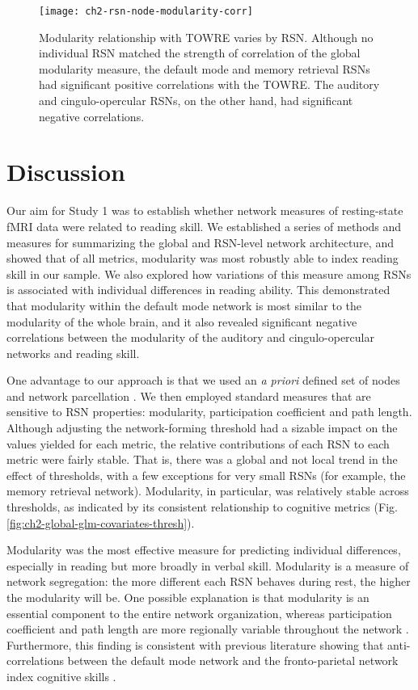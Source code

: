 \begin{figure}[t]
    \centering
    \texttt{[image: ch2-rsn-node-modularity-corr]}
    \caption[Modularity relationship with TOWRE varies by RSN.] {Modularity relationship with TOWRE varies by RSN. Although no individual RSN matched the strength of correlation of the global modularity measure, the default mode and memory retrieval RSNs had significant positive correlations with the TOWRE. The auditory and cingulo-opercular RSNs, on the other hand, had significant negative correlations.}
    \label{fig:ch2-rsn-node-modularity-corr}
\end{figure}

\section{Discussion}

Our aim for Study 1 was to establish whether network measures of resting-state fMRI data were related to reading skill. We established a series of methods and measures for summarizing the global and RSN-level network architecture, and showed that of all metrics, modularity was most robustly able to index reading skill in our sample. We also explored how variations of this measure among RSNs is associated with individual differences in reading ability. This demonstrated that modularity within the default mode network is most similar to the modularity of the whole brain, and it also revealed significant negative correlations between the modularity of the auditory and cingulo-opercular networks and reading skill.

One advantage to our approach is that we used an \textit{a priori} defined set of nodes and network parcellation \citep{Power2013}. We then employed standard measures that are sensitive to RSN properties: modularity, participation coefficient and path length. Although adjusting the network-forming threshold had a sizable impact on the values yielded for each metric, the relative contributions of each RSN to each metric were fairly stable. That is, there was a global and not local trend in the effect of thresholds, with a few exceptions for very small RSNs (for example, the memory retrieval network). Modularity, in particular, was relatively stable across thresholds, as indicated by its consistent relationship to cognitive metrics (Fig. \ref{fig:ch2-global-glm-covariates-thresh}).

Modularity was the most effective measure for predicting individual differences, especially in reading but more broadly in verbal skill. Modularity is a measure of network segregation: the more different each RSN behaves during rest, the higher the modularity will be. One possible explanation is that modularity is an essential component to the entire network organization, whereas participation coefficient and path length are more regionally variable throughout the network \citep{Bullmore2012}. Furthermore, this finding is consistent with previous literature showing that anti-correlations between the default mode network and the fronto-parietal network index cognitive skills \citep{Anticevic2012}. 


